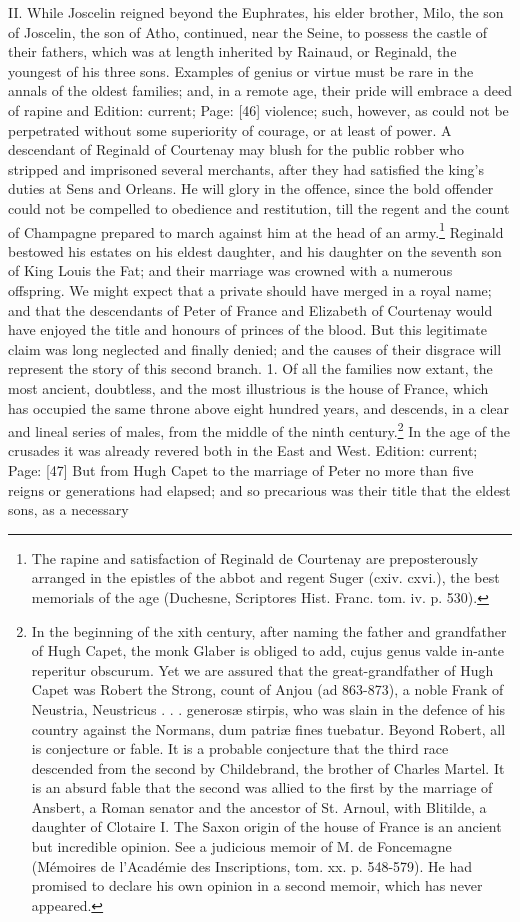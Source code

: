 II. While Joscelin reigned beyond the Euphrates, his elder brother, Milo, the son of Joscelin, the son of Atho, continued, near the Seine, to possess the castle of their fathers, which was at length inherited by Rainaud, or Reginald, the youngest of his three sons. Examples of genius or virtue must be rare in the annals of the oldest families; and, in a remote age, their pride will embrace a deed of rapine and Edition: current; Page: [46] violence; such, however, as could not be perpetrated without some superiority of courage, or at least of power. A descendant of Reginald of Courtenay may blush for the public robber who stripped and imprisoned several merchants, after they had satisfied the king\texthebrew{}’s duties at Sens and Orleans. He will glory in the offence, since the bold offender could not be compelled to obedience and restitution, till the regent and the count of Champagne prepared to march against him at the head of an army.\footnote{The rapine and satisfaction of Reginald de Courtenay are preposterously arranged in the epistles of the abbot and regent Suger (cxiv. cxvi.), the best memorials of the age (Duchesne, Scriptores Hist. Franc. tom. iv. p. 530).} Reginald bestowed his estates on his eldest daughter, and his daughter on the seventh son of King Louis the Fat; and their marriage was crowned with a numerous offspring. We might expect that a private should have merged in a royal name; and that the descendants of Peter of France and Elizabeth of Courtenay would have enjoyed the title and honours of princes of the blood. But this legitimate claim was long neglected and finally denied; and the causes of their disgrace will represent the story of this second branch. 1. Of all the families now extant, the most ancient, doubtless, and the most illustrious is the house of France, which has occupied the same throne above eight hundred years, and descends, in a clear and lineal series of males, from the middle of the ninth century.\footnote{In the beginning of the xith century, after naming the father and grandfather of Hugh Capet, the monk Glaber is obliged to add, cujus genus valde in-ante reperitur obscurum. Yet we are assured that the great-grandfather of Hugh Capet was Robert the Strong, count of Anjou (ad 863-873), a noble Frank of Neustria, Neustricus . . . generosæ stirpis, who was slain in the defence of his country against the Normans, dum patriæ fines tuebatur. Beyond Robert, all is conjecture or fable. It is a probable conjecture that the third race descended from the second by Childebrand, the brother of Charles Martel. It is an absurd fable that the second was allied to the first by the marriage of Ansbert, a Roman senator and the ancestor of St. Arnoul, with Blitilde, a daughter of Clotaire I. The Saxon origin of the house of France is an ancient but incredible opinion. See a judicious memoir of M. de Foncemagne (Mémoires de l\texthebrew{}’Académie des Inscriptions, tom. xx. p. 548-579). He had promised to declare his own opinion in a second memoir, which has never appeared.} In the age of the crusades it was already revered both in the East and West. Edition: current; Page: [47] But from Hugh Capet to the marriage of Peter no more than five reigns or generations had elapsed; and so precarious was their title that the eldest sons, as a necessary 